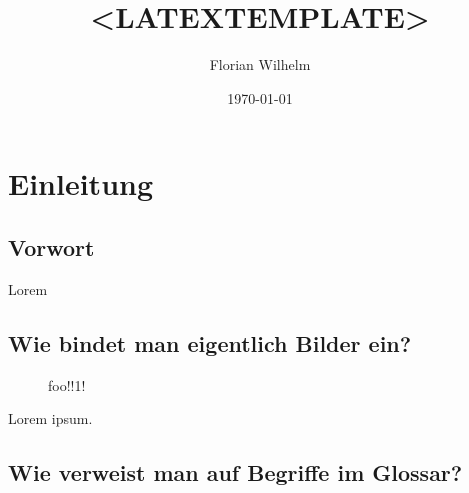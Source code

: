 \documentclass[11pt,a4paper,titlepage,ngerman]{article}
\begin{document}
\lstset{breaklines=true}

\begin{titlepage}
\title{<LATEXTEMPLATE>}
\author{Florian Wilhelm}
\date{\today}
\maketitle
\end{titlepage}

\tableofcontents
\newpage

\section{Einleitung}

\subsection{Vorwort}

Lorem

\subsection{Wie bindet man eigentlich Bilder ein?}

\begin{figure}[htbp]
  \centering
  \caption{foo!!1! }
  \label{footo}
\end{figure}

Lorem ipsum.

\subsection{Wie verweist man auf Begriffe im Glossar?}
\end{document}
